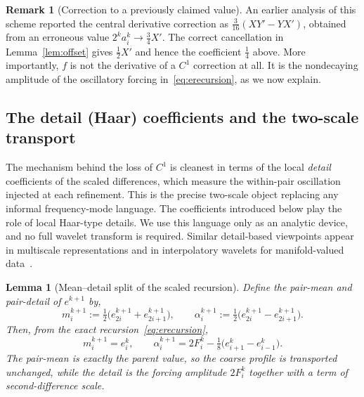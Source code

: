 \documentclass{article}
\theoremstyle{plain}
\newtheorem{lemma}[theorem]{Lemma}
\theoremstyle{definition}
\newtheorem{remark}[theorem]{Remark}
\begin{document}
\begin{remark}[Correction to a previously claimed value]\label{rem:correction-to-claim}
An earlier analysis of this scheme reported the central derivative correction
as $\tfrac{3}{16}(XY'-YX')$, obtained from an erroneous value
$2^k a_i^k\to\tfrac34 X'$. The correct cancellation in
Lemma~\ref{lem:offset} gives $\tfrac12 X'$ and hence the coefficient
$\tfrac14$ above. More importantly, $f$ is not the derivative of a $C^1$
correction at all. It is the nondecaying amplitude of the oscillatory forcing
in~\eqref{eq:erecursion}, as we now explain.
\end{remark}

\subsection{The detail (Haar) coefficients and the two-scale transport}\label{sec:detail}

The mechanism behind the loss of $C^1$ is cleanest in terms of the local
\emph{detail} coefficients of the scaled differences, which measure the
within-pair oscillation injected at each refinement. This is the precise
two-scale object replacing any informal frequency-mode language. The
coefficients introduced below play the role of local Haar-type details. We use
this language only as an analytic device, and no full wavelet transform is
required. Similar detail-based viewpoints appear in multiscale representations
and in interpolatory wavelets for manifold-valued
data~\cite{GrohsWallner09, Meyer92, RahmanEtal05}.

\begin{lemma}[Mean--detail split of the scaled recursion]\label{lem:detail}
Define the pair-mean and pair-detail of $e^{k+1}$ by,
\[
  m_i^{k+1}:=\tfrac12\bigl(e_{2i}^{k+1}+e_{2i+1}^{k+1}\bigr),\qquad
  \alpha_i^{k+1}:=\tfrac12\bigl(e_{2i}^{k+1}-e_{2i+1}^{k+1}\bigr).
\]
Then, from the exact recursion~\eqref{eq:erecursion},
\begin{equation}\label{eq:meandetail}
  m_i^{k+1}=e_i^{k},
  \qquad
  \alpha_i^{k+1}=2F_i^{k}-\tfrac18\bigl(e_{i+1}^{k}-e_{i-1}^{k}\bigr).
\end{equation}
The pair-mean is exactly the parent value, so the coarse profile is transported
unchanged, while the detail is the forcing amplitude $2F_i^k$ together with a
term of second-difference scale.
\end{lemma}
\end{document}
